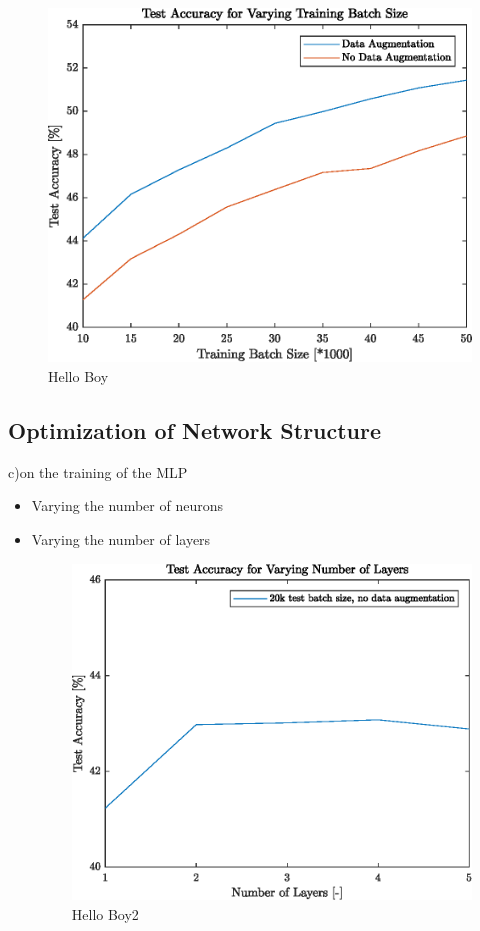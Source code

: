    	\begin{figure}[h!]
		\centering
   	  	\includegraphics{images/dataAugmentation}
   	  	\caption{Hello Boy}
   	  	\label{fig:test1}
   	\end{figure}
\FloatBarrier

\subsection{Optimization of Network Structure}\label{subsec:netStruct}
c)on the training of the MLP    
\begin{itemize}
   	\item Varying the number of neurons	
	\item Varying the number of layers
	
	  	\begin{figure}[h!]
	  		\centering	  		
	  		\includegraphics{images/numberlayers}
	  		\caption{Hello Boy2}
	  		\label{fig:test2}
	  	\end{figure}	
\end{itemize}

